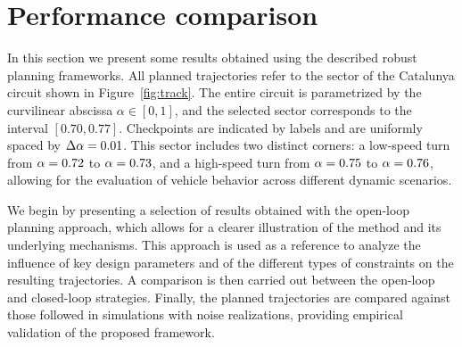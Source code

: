 \section{Performance comparison} 
\label{sec:performance_comparison}

In this section we present some results obtained using the described robust planning frameworks. All planned trajectories refer to the sector of the Catalunya circuit shown in Figure~\ref{fig:track}. 
The entire circuit is parametrized by the curvilinear abscissa $\alpha \in [0,1]$, and the selected sector corresponds to the interval $\left[0.70, 0.77\right]$. Checkpoints are indicated by labels and are uniformly spaced by $\Delta\alpha=0.01$. This sector includes two distinct corners: a low-speed turn from $\alpha = 0.72$ to $\alpha = 0.73$, and a high-speed turn from $\alpha = 0.75$ to $\alpha = 0.76$, allowing for the evaluation of vehicle behavior across different dynamic scenarios.

We begin by presenting a selection of results obtained with the open-loop planning approach, which allows for a clearer illustration of the method and its underlying mechanisms. This approach is used as a reference to analyze the influence of key design parameters and of the different types of constraints on the resulting trajectories. A comparison is then carried out between the open-loop and closed-loop strategies. Finally, the planned trajectories are compared against those followed in simulations with noise realizations, providing empirical validation of the proposed framework.


